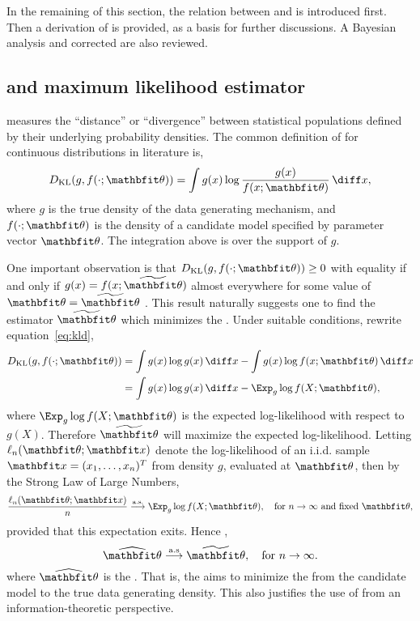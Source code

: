 \documentclass[11pt, hyper, bib, fontset=Minion]{marticle}
\begin{document}
In the remaining of this section, the relation between \kl and \mle is
introduced first. Then a derivation of \aic is provided, as a basis for
further discussions. A Bayesian analysis and corrected \aic are also reviewed.

\subsection{\protect\kl and maximum likelihood estimator}
\label{sub:kl and maximum likelihood estimator}

\kl measures the ``distance'' or ``divergence'' between statistical
populations defined by their underlying probability densities. The common
definition of \kl for continuous distributions in literature is,
\begin{equation}
  \dkl(g, f(\cdot;\bth)) = \int g(x)\log\frac{g(x)}{f(x;\bth)}\dd x,
  \label{eq:kld}
\end{equation}
where $g$ is the true density of the data generating mechanism, and
$f(\cdot;\bth)$ is the density of a candidate model specified by parameter
vector $\bth$. The integration above is over the support of $g$.

One important observation is that $\dkl(g,f(\cdot;\bth))\ge0$ with equality if
and only if $g(x) = f(x;\tbth)$ almost everywhere for some value of $\bth =
\tbth$ \parencite{Kullback:1951va}. This result naturally suggests one to find
the estimator $\tbth$ which minimizes the \kl. Under suitable conditions,
rewrite equation~\eqref{eq:kld},
\begin{align}
  \dkl(g,f(\cdot;\bth))
  & = \int g(x)\log g(x)\dd x - \int g(x)\log f(x;\bth)\dd x \notag\\
  & = \int g(x)\log g(x)\dd x - \Exp_g \log f(X;\bth),
  \label{eq:kl exp ll}
\end{align}
where $\Exp_g\log f(X;\bth)$ is the expected log-likelihood with respect to
$g(X)$. Therefore $\tbth$ will maximize the expected log-likelihood. Letting
$\ell_n(\bth;\bfx)$ denote the log-likelihood of an i.i.d. sample $\bfx =
(x_1,\dots,x_n)^T$ from density $g$, evaluated at $\bth$, then by the Strong
Law of Large Numbers,
\begin{equation}
  \frac{\ell_n(\bth;\bfx)}{n}
  \overset{\mathrm{a.s.}}{\longrightarrow}
  \Exp_g\log f(X;\bth), \quad\text{for } n\to\infty\text{ and fixed }\bth,
  \label{eq:kl consistency}
\end{equation}
provided that this expectation exits. Hence \parencite[see][for
details]{Kullback:1951va},
\begin{equation}
  \hbth \overset{\mathrm{a.s}}{\longrightarrow} \tbth,
  \quad\text{for } n\to\infty.
\end{equation}
where $\hbth$ is the \mle. That is, the \mle aims to minimize the \kl from the
candidate model to the true data generating density. This also justifies the
use of \mle from an information-theoretic perspective.
\end{document}
